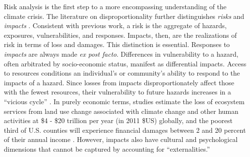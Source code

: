 Risk analysis is the first step to a more encompassing understanding of the
climate crisis. The literature on disproportionality further distinguishes
\textit{risks} and \textit{impacts} \cite{dorkenoo_critical_2022}. Consistent
with previous work, a risk is the aggregate of hazards, exposures,
vulnerabilities, and responses. Impacts, then, are the realizations of risk in
terms of loss and damages. This distinction is essential. Responses to
\textit{impacts} are always made \textit{ex post facto}. Differences in
vulnerability to a hazard, often arbitrated by socio-economic status, manifest
as differential impacts. Access to resources conditions an individual's or
community's ability to respond to the impacts of a hazard. Since losses from
impacts disproportionately affect those with the fewest resources, their
vulnerability to future hazards increases in a ``vicious cycle''
\cite{islam_climate_2017, dorkenoo_critical_2022}. In purely economic terms,
studies estimate the loss of ecosystem services from land use change associated
with climate change and other human activities at \$4 - \$20 trillion per year
(in 2011 \$US) globally, \cite{costanza_changes_2014} and the poorest third of
U.S. counties will experience financial damages between 2 and 20 percent of
their annual income \cite{hsiang_estimating_2017}. However, impacts also have
cultural and psychological dimensions \cite{dorkenoo_critical_2022} that cannot
be captured by accounting for ``externalities.''



